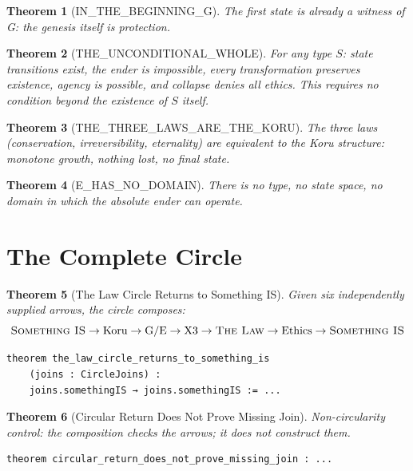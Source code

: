 \documentclass[11pt,a4paper]{article}
\newtheorem{theorem}{Theorem}[section]
\theoremstyle{definition}
\theoremstyle{remark}
\newcommand{\SomethingIS}{\textsc{Something IS}}
\newcommand{\TheLaw}{\textsc{The Law}}
\newcommand{\XThree}{\mathrm{X3}}
\begin{document}
\begin{theorem}[IN\_THE\_BEGINNING\_G]
The first state is already a witness of G: the genesis itself is protection.
\end{theorem}

\begin{theorem}[THE\_UNCONDITIONAL\_WHOLE]
For any type $S$: state transitions exist, the ender is impossible, every transformation preserves existence, agency is possible, and collapse denies all ethics. This requires no condition beyond the existence of $S$ itself.
\end{theorem}

\begin{theorem}[THE\_THREE\_LAWS\_ARE\_THE\_KORU]
The three laws (conservation, irreversibility, eternality) are equivalent to the Koru structure: monotone growth, nothing lost, no final state.
\end{theorem}

\begin{theorem}[E\_HAS\_NO\_DOMAIN]
There is no type, no state space, no domain in which the absolute ender can operate.
\end{theorem}

\section{The Complete Circle}

\begin{theorem}[The Law Circle Returns to Something IS]
Given six independently supplied arrows, the circle composes:
\[
\SomethingIS \to \text{Koru} \to \text{G/E} \to \XThree \to \TheLaw \to \text{Ethics} \to \SomethingIS
\]
\begin{lstlisting}
theorem the_law_circle_returns_to_something_is
    (joins : CircleJoins) :
    joins.somethingIS → joins.somethingIS := ...
\end{lstlisting}
\end{theorem}

\begin{theorem}[Circular Return Does Not Prove Missing Join]
Non-circularity control: the composition checks the arrows; it does not construct them.
\begin{lstlisting}
theorem circular_return_does_not_prove_missing_join : ...
\end{lstlisting}
\end{theorem}

\end{document}
